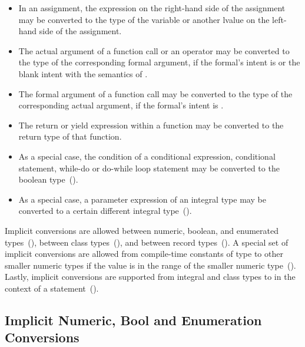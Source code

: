 \begin{itemize}
\item In an assignment, the expression on the right-hand side of
      the assignment may be converted to the type of the variable
      or another lvalue on the left-hand side of the assignment.

\item The actual argument of a function call or an operator may be converted
      to the type of the corresponding formal argument, if the formal's
      intent is  or the blank intent with the semantics of
      .

\item The formal argument of a function call may be converted
      to the type of the corresponding actual argument, if the formal's
      intent is .

\item The return or yield expression within a function may be converted
      to the return type of that function.

\item As a special case, the condition of a conditional expression,
      conditional statement, while-do or do-while loop statement
      may be converted to the boolean type~().

\item As a special case, a parameter expression of an integral type
      may be converted to a certain different integral type~().

\end{itemize}

Implicit conversions are allowed between
numeric, boolean, and enumerated types~(),
between class
types~(), and between record
types~().  A special set of implicit
conversions are allowed from compile-time constants of type 
to other smaller numeric types if the value is in
the range of the smaller numeric
type~().  Lastly,
implicit conversions are supported from integral and class types to
 in the context of a statement~().


\subsection{Implicit Numeric, Bool and Enumeration Conversions}
\label{Implicit_NumBoolEnum_Conversions}

